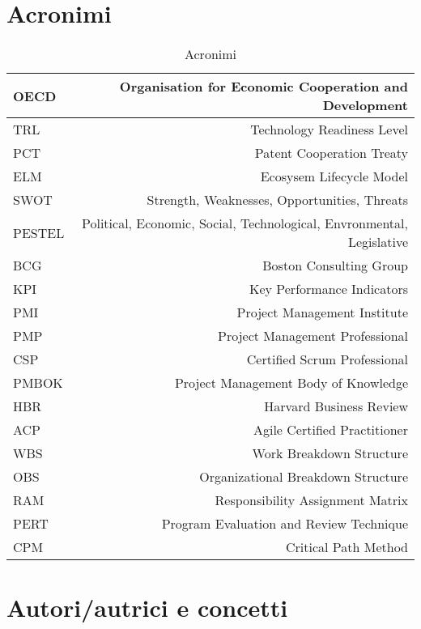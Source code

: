 \documentclass[answers, a4paper, 11pt]{exam}
\begin{document}
\section{Acronimi}
\begin{table}[h!]
    \centering
    \begin{tabular}{|l|r|}
    \hline
    OECD & Organisation for Economic Cooperation and Development
    \\ \hline TRL & Technology Readiness Level
    \\ \hline PCT & Patent Cooperation Treaty
    \\ \hline ELM & Ecosysem Lifecycle Model
    \\ \hline SWOT & Strength, Weaknesses, Opportunities, Threats
    \\ \hline PESTEL & Political, Economic, Social, Technological, Envronmental, Legislative
    \\ \hline BCG & Boston Consulting Group
    \\ \hline KPI & Key Performance Indicators
    \\ \hline PMI & Project Management Institute
    \\ \hline PMP & Project Management Professional
    \\ \hline CSP & Certified Scrum Professional
    \\ \hline PMBOK & Project Management Body of Knowledge
    \\ \hline HBR & Harvard Business Review
    \\ \hline ACP & Agile Certified Practitioner
    \\ \hline WBS & Work Breakdown Structure
    \\ \hline OBS & Organizational Breakdown Structure
    \\ \hline RAM & Responsibility Assignment Matrix
    \\ \hline PERT & Program Evaluation and Review Technique
    \\ \hline CPM & Critical Path Method \\ \hline
    \end{tabular}
    \caption{Acronimi}
    \label{tab:acronyms}
\end{table}

\pagebreak
\section{Autori/autrici e concetti}
\end{document}
